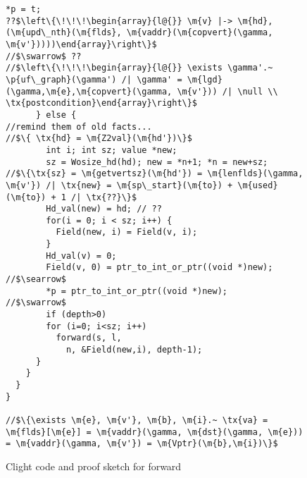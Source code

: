 \begin{figure*}
\begin{lstlisting}[multicols=2]
        *p = t;
??$\left\{\!\!\!\begin{array}{l@{}} \m{v} |-> \m{hd},(\m{upd\_nth}(\m{flds}, \m{vaddr}(\m{copvert}(\gamma, \m{v'}))))\end{array}\right\}$
//$\swarrow$ ??
//$\left\{\!\!\!\begin{array}{l@{}} \exists \gamma'.~ \p{uf\_graph}(\gamma') /| \gamma' = \m{lgd}(\gamma,\m{e},\m{copvert}(\gamma, \m{v'})) /| \null \\ \tx{postcondition}\end{array}\right\}$
      } else {
//remind them of old facts...
//$\{ \tx{hd} = \m{Z2val}(\m{hd'})\}$
        int i; int sz; value *new;
        sz = Wosize_hd(hd); new = *n+1; *n = new+sz;
//$\{\tx{sz} = \m{getvertsz}(\m{hd'}) = \m{lenflds}(\gamma, \m{v'}) /| \tx{new} = \m{sp\_start}(\m{to}) + \m{used}(\m{to}) + 1 /| \tx{??}\}$        
        Hd_val(new) = hd; // ??
        for(i = 0; i < sz; i++) {
          Field(new, i) = Field(v, i);
        }
        Hd_val(v) = 0;
        Field(v, 0) = ptr_to_int_or_ptr((void *)new);
//$\searrow$
        *p = ptr_to_int_or_ptr((void *)new);
//$\swarrow$
        if (depth>0)
        for (i=0; i<sz; i++)
          forward(s, l, 
            n, &Field(new,i), depth-1);
      }
    }
  }
}

//$\{\exists \m{e}, \m{v'}, \m{b}, \m{i}.~ \tx{va} = \m{flds}[\m{e}] = \m{vaddr}(\gamma, \m{dst}(\gamma, \m{e})) = \m{vaddr}(\gamma, \m{v'}) = \m{Vptr}(\m{b},\m{i})\}$

\end{lstlisting}

\vspace{-0.4em}
\caption{Clight code and proof sketch for forward}
\label{fig:forward}
\vspace{-1em}
\end{figure*}